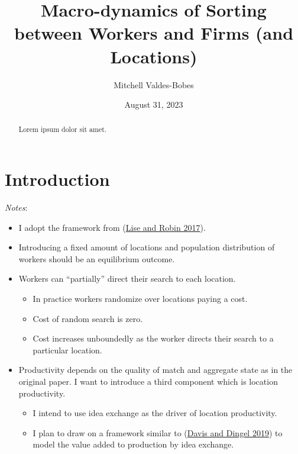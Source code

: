 \documentclass[
  letterpaper,
  DIV=11,
  numbers=noendperiod]{scrreprt}
\title{Macro-dynamics of Sorting between Workers and Firms (and
Locations)}
\author{Mitchell Valdes-Bobes}
\date{August 31, 2023}
\providecommand{\tightlist}{%
  \setlength{\itemsep}{0pt}\setlength{\parskip}{0pt}}\usepackage{longtable,booktabs,array}
\renewcommand*\contentsname{Table of contents}
\newcommand\contentsname{Table of contents}
\begin{document}
\maketitle
\begin{abstract}
Lorem ipsum dolor sit amet.
\end{abstract}
\ifdefined\Shaded\renewenvironment{Shaded}{\begin{tcolorbox}[interior hidden, borderline west={3pt}{0pt}{shadecolor}, boxrule=0pt, frame hidden, enhanced, breakable, sharp corners]}{\end{tcolorbox}}\fi

\renewcommand*\contentsname{Table of contents}
{
\hypersetup{linkcolor=}
\setcounter{tocdepth}{2}
\tableofcontents
}

\hypertarget{introduction}{%
\chapter{Introduction}\label{introduction}}

\emph{Notes}:

\begin{itemize}
\tightlist
\item
  I adopt the framework from
  (\protect\hyperlink{ref-liseMacrodynamicsSortingWorkers2017}{Lise and
  Robin 2017}).
\item
  Introducing a fixed amount of locations and population distribution of
  workers should be an equilibrium outcome.
\item
  Workers can ``partially'' direct their search to each location.

  \begin{itemize}
  \tightlist
  \item
    In practice workers randomize over locations paying a cost.
  \item
    Cost of random search is zero.
  \item
    Cost increases unboundedly as the worker directs their search to a
    particular location.
  \end{itemize}
\item
  Productivity depends on the quality of match and aggregate state as in
  the original paper. I want to introduce a third component which is
  location productivity.

  \begin{itemize}
  \tightlist
  \item
    I intend to use idea exchange as the driver of location
    productivity.
  \item
    I plan to draw on a framework similar to
    (\protect\hyperlink{ref-davisSpatialKnowledgeEconomy2019}{Davis and
    Dingel 2019}) to model the value added to production by idea
    exchange.
  \end{itemize}
\end{itemize}
\end{document}
